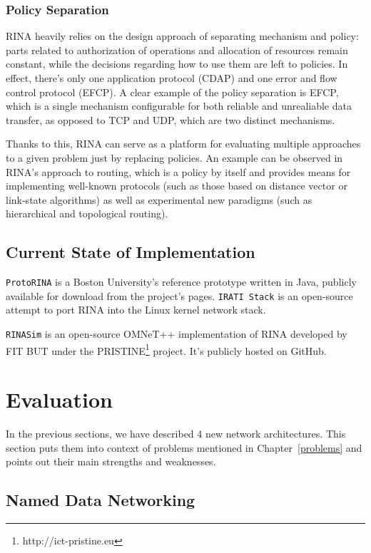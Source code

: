             \subsubsection{Policy Separation}

                RINA heavily relies on the design approach of separating mechanism and policy: parts related to authorization of operations and allocation of resources remain constant, while the decisions regarding how to use them are left to policies. In effect, there's only one application protocol (CDAP) and one error and flow control protocol (EFCP). A clear example of the policy separation is EFCP, which is a single mechanism configurable for both reliable and unrealiable data transfer, as opposed to TCP and UDP, which are two distinct mechanisms.

                Thanks to this, RINA can serve as a platform for evaluating multiple approaches to a given problem just by replacing policies. An example can be observed in RINA's approach to routing, which is a policy by itself and provides means for implementing well-known protocols (such as those based on distance vector or link-state algorithms) as well as experimental new paradigms (such as hierarchical and topological routing).

        \subsection{Current State of Implementation}

            \texttt{ProtoRINA} is a Boston University's reference prototype written in Java, publicly available for download from the project's pages. \texttt{IRATI Stack} is an open-source attempt to port RINA into the Linux kernel network stack.

            \texttt{RINASim} is an open-source OMNeT++ implementation of RINA developed by FIT BUT under the PRISTINE\footnote{http://ict-pristine.eu} project. It's publicly hosted on GitHub.

    \section{Evaluation}

        In the previous sections, we have described 4 new network architectures. This section puts them into context of problems mentioned in Chapter~\ref{problems} and points out their main strengths and weaknesses.

        \subsection{Named Data Networking}

